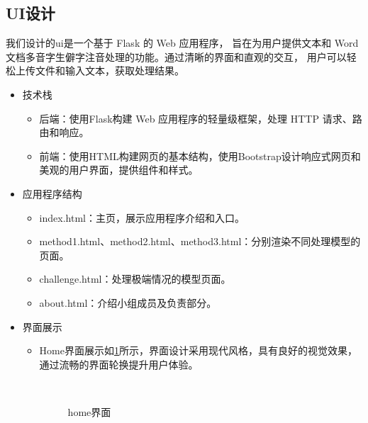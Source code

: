 \documentclass[12pt,hyperref,a4paper,UTF8]{ctexart}
\begin{document}
\subsection{UI设计}
我们设计的ui是一个基于 Flask 的 Web 应用程序，
旨在为用户提供文本和 Word 文档多音字生僻字注音处理的功能。通过清晰的界面和直观的交互，
用户可以轻松上传文件和输入文本，获取处理结果。
\begin{itemize}
    \item 技术栈
    \begin{itemize}
        \item 后端：使用Flask构建 Web 应用程序的轻量级框架，处理 HTTP 请求、路由和响应。
        \item 前端：使用HTML构建网页的基本结构，使用Bootstrap设计响应式网页和美观的用户界面，提供组件和样式。
    \end{itemize}
    \item 应用程序结构
    \begin{itemize}
        \item index.html：主页，展示应用程序介绍和入口。
        \item method1.html、method2.html、method3.html：分别渲染不同处理模型的页面。
        \item challenge.html：处理极端情况的模型页面。
        \item about.html：介绍小组成员及负责部分。
    \end{itemize}
    \item 界面展示
    \begin{itemize}
        \item Home界面展示如\ref{fig_E1}所示，界面设计采用现代风格，具有良好的视觉效果，通过流畅的界面轮换提升用户体验。
        \begin{figure}[htbp]
            \centering
            \\
            \caption{home界面}
            \label{fig_E1}
        \end{figure}  
        

\end{itemize}
\end{itemize}
\end{document}
